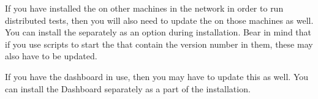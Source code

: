 If you have installed the \gdagent{} on other machines in the network in order to run distributed tests, then you will also need to update the \gdagent{} on those machines as well. You can install the \gdagent{} separately as an option during installation. Bear in mind that if you use scripts to start the \gdagent{} that contain the version number in them, these may also have to be updated. 

If you have the dashboard in use, then you may have to update this as well. You can install the Dashboard separately as a part of the installation.
